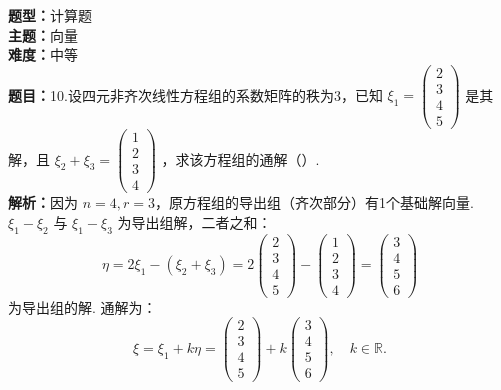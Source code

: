 \documentclass{ctexart}
\newenvironment{question}[5]{%
	\noindent\textbf{题型：}#1\\
	\textbf{主题：}#2\\
	\textbf{难度：}#3\\
	\textbf{题目：}#4\\
	\textbf{解析：}#5\\
	\vspace{1em}
}{}
\begin{document}
	\begin{question}
		{计算题}
		{向量}
		{中等}
		{10.设四元非齐次线性方程组的系数矩阵的秩为3，已知 \(\xi_1=\left(\begin{array}{l}2\\3\\4\\5\end{array}\right)\) 是其解，且 \(\xi_2+\xi_3=\left(\begin{array}{l}1\\2\\3\\4\end{array}\right)\) ，求该方程组的通解（）. }
		{因为 \(n=4, r=3\)，原方程组的导出组（齐次部分）有1个基础解向量. \(\xi_1-\xi_2\) 与 \(\xi_1-\xi_3\) 为导出组解，二者之和：
			\[
			\eta = 2\xi_1 - (\xi_2+\xi_3) = 2\left(\begin{array}{l}2\\3\\4\\5\end{array}\right) - \left(\begin{array}{l}1\\2\\3\\4\end{array}\right) = \left(\begin{array}{l}3\\4\\5\\6\end{array}\right)
			\]
			为导出组的解. 通解为：
			\[
			\xi = \xi_1 + k\eta = \left(\begin{array}{l}2\\3\\4\\5\end{array}\right) + k\left(\begin{array}{l}3\\4\\5\\6\end{array}\right), \quad k \in \mathbb{R}.
			\]
		}
	\end{question}
	
\end{document}
